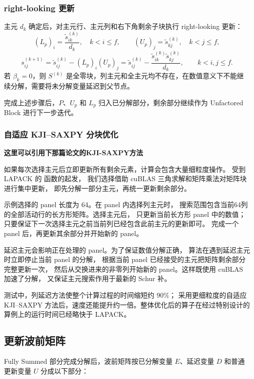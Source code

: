 \subsubsection{right-looking 更新}
主元 $d_k$ 确定后，对主元行、主元列和右下角剩余子块执行 right-looking 更新：
$$(L_p)_i=\frac{\widetilde s_{ik}^{(k)}}{d_k},
\quad k<i\le f,
\qquad
(U_p)_j=\widetilde s_{kj}^{(k)},
\quad k<j\le f,$$
$$s_{ij}^{(k+1)}
=\widetilde s_{ij}^{(k)}-(L_p)_i(U_p)_j
=\widetilde s_{ij}^{(k)}
-\frac{\widetilde s_{ik}^{(k)}\widetilde s_{kj}^{(k)}}{d_k},
\qquad k<i,j\le f.$$
\qquad 若 $\beta_k=0$，则 $S^{(k)}$ 是全零块，列主元和全主元均不存在，在数值意义下不能继续分解，需要将未分解变量延迟到父节点。

完成上述步骤后，$P$、$U_p$ 和 $L_p$ 归入已分解部分，剩余部分继续作为 Unfactored Block 进行下一步迭代。
\subsubsection{自适应 KJI--SAXPY 分块优化}
\textbf{这里可以引用下那篇论文的KJI-SAXPY方法}

如果每次选择主元后立即更新所有剩余元素，计算会包含大量细粒度操作。
受到LAPACK 的  函数的起发，
我们选择借助 cuBLAS 三角求解和矩阵乘法对矩阵块进行集中更新，
即先分解一部分主元，再统一更新剩余部分。

示例选择的 panel 长度为 64。在 panel 内选择列主元时，
搜索范围包含当前64列的全部活动行的长方形矩阵。选择主元后，
只更新当前长方形 panel 中的数值；只要保证下一次选择主元之前当前列已经包含此前主元的更新即可。
完成一个 panel 后，再更新其余部分并开始新的 panel。

延迟主元会影响正在处理的 panel。为了保证数值分解正确，
算法在遇到延迟主元时立即停止当前 panel 的分解，
根据当前 panel 已经接受的主元把矩阵剩余部分完整更新一次，
然后从交换进来的非零列开始新的 panel。这样既使用 cuBLAS 加速了分解，
又保证主元搜索作用于最新的 Schur 补。

测试中，列延迟方法使整个计算过程的时间缩短约 $90\%$；
采用更细粒度的自适应 KJI--SAXPY 方法后，速度还能提升约一倍。整体优化后的算子在经过特别设计的算例上的运行时间已经略快于 LAPACK。

\subsection{更新波前矩阵}

Fully Summed 部分完成分解后，波前矩阵按已分解变量 $E$、延迟变量 $D$ 和普通更新变量 $U$ 分成以下部分：

